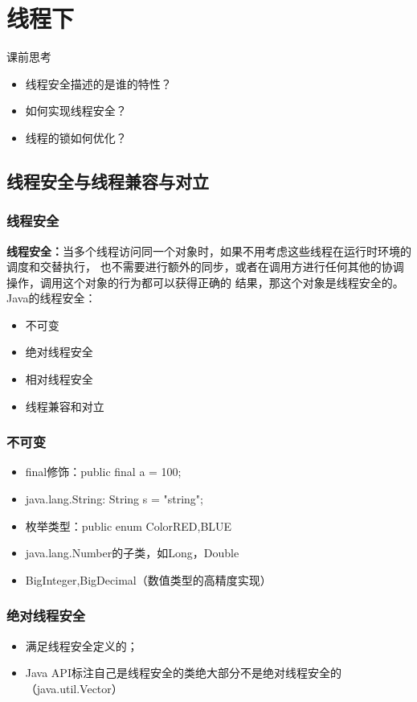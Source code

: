 \chapter{线程下}
课前思考
\begin{itemize}
	\item 线程安全描述的是谁的特性？
	\item 如何实现线程安全？
	\item 线程的锁如何优化？
\end{itemize}
\section{线程安全与线程兼容与对立}
\subsection{线程安全}
\textbf{线程安全：}当多个线程访问同一个对象时，如果不用考虑这些线程在运行时环境的调度和交替执行，
也不需要进行额外的同步，或者在调用方进行任何其他的协调操作，调用这个对象的行为都可以获得正确的
结果，那这个对象是线程安全的。
\\ Java的线程安全：
\begin{itemize}
	\item 不可变
	\item 绝对线程安全
	\item 相对线程安全
	\item 线程兼容和对立
\end{itemize}
\subsection{不可变}
\begin{itemize}
	\item final修饰：public final a = 100;
	\item java.lang.String: String s = "string";
	\item 枚举类型：public enum Color{RED,BLUE}
	\item java.lang.Number的子类，如Long，Double
	\item BigInteger,BigDecimal（数值类型的高精度实现）
\end{itemize}
\subsection{绝对线程安全}
\begin{itemize}
	\item 满足线程安全定义的；
	\item Java API标注自己是线程安全的类绝大部分不是绝对线程安全的（java.util.Vector）
\end{itemize}
